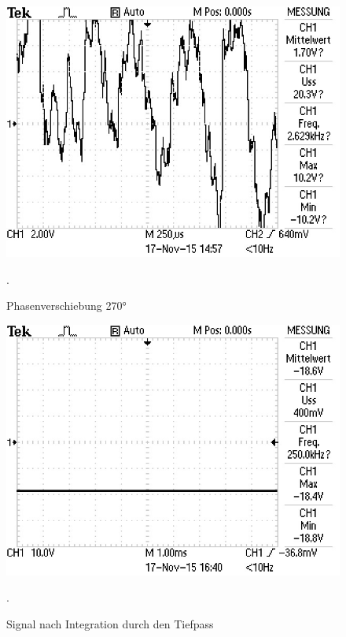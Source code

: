  \begin{figure}
   \centering
   \includegraphics[width=\textwidth]{bilder/Mit Rauschen/5.JPG}
 \caption{Phasenverschiebung 270°}.
   \label{fig:5}
 \end{figure}

 \begin{figure}
   \centering
   \includegraphics[width=\textwidth]{bilder/Mit Rauschen/6.JPG}
 \caption{Signal nach Integration durch den Tiefpass}.
   \label{fig:6}
 \end{figure}

